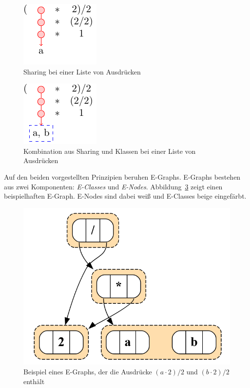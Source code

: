 {
\begin{minipage}[c]{0.5\linewidth}
    \begin{figure}[H]
        \centering
        \includegraphics[scale=1.6]{../fig/sharing.pdf}
        \caption{Sharing bei einer Liste von Ausdrücken}
        \label{fig:sharing}
    \end{figure}
    \end{minipage}
    \begin{minipage}[c]{0.5\linewidth}
    \begin{figure}[H]
        \centering
        \includegraphics[scale=1.6]{../fig/classes.pdf}
        \caption{Kombination aus Sharing und Klassen bei einer Liste von Ausdrücken}
        \label{fig:classes}
    \end{figure}
\end{minipage}}

Auf den beiden vorgestellten Prinzipien beruhen E-Graphs. E-Graphs bestehen aus zwei Komponenten: \textit{E-Classes} und \textit{E-Nodes}. 
Abbildung~\ref{fig:egraphexp} zeigt einen beispielhaften E-Graph. E-Nodes sind dabei weiß und E-Classes beige eingefärbt.

\begin{figure}[H]
  \centering
  \includegraphics[scale=0.5]{../fig/egraph_exp.png}
  \caption{Beispiel eines E-Graphs, der die Ausdrücke $(a \cdot 2) / 2$ und $(b \cdot 2) / 2$ enthält}
  \label{fig:egraphexp}
\end{figure}

